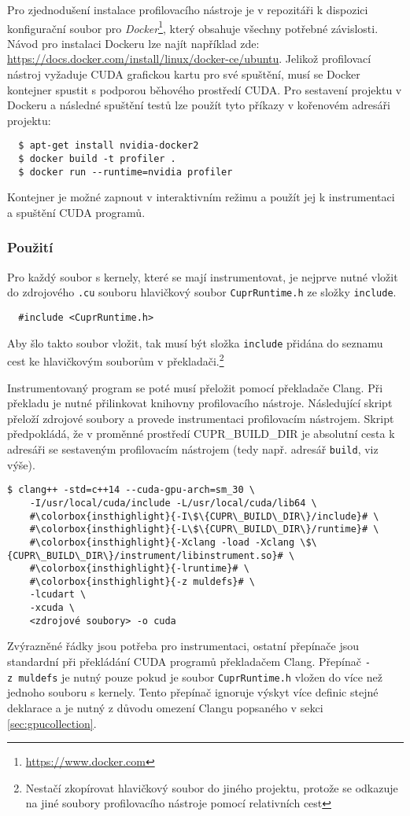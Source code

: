 Pro zjednodušení instalace profilovacího nástroje je v repozitáři k dispozici konfigurační soubor pro \emph{Docker}\footnote{\url{https://www.docker.com}}, který obsahuje všechny potřebné závislosti. Návod pro instalaci Dockeru lze najít například zde: \url{https://docs.docker.com/install/linux/docker-ce/ubuntu}.
Jelikož profilovací nástroj vyžaduje CUDA grafickou kartu pro své spuštění, musí se Docker kontejner spustit s podporou běhového prostředí CUDA. Pro sestavení projektu v Dockeru a následné spuštění testů lze použít tyto příkazy v kořenovém adresáři projektu:
\begin{verbatim}
  $ apt-get install nvidia-docker2
  $ docker build -t profiler .
  $ docker run --runtime=nvidia profiler
\end{verbatim}

Kontejner je možné zapnout v interaktivním režimu a použít jej k instrumentaci a spuštění CUDA programů.

\subsubsection{Použití}
\label{manual:usage}
Pro každý soubor s kernely, které se mají instrumentovat, je nejprve nutné vložit do zdrojového \texttt{.cu} souboru hlavičkový soubor \texttt{CuprRuntime.h} ze složky \texttt{include}.
\begin{verbatim}
  #include <CuprRuntime.h>
\end{verbatim}
Aby šlo takto soubor vložit, tak musí být složka \texttt{include} přidána do seznamu cest ke hlavičkovým souborům v překladači.\footnote{Nestačí zkopírovat hlavičkový soubor do jiného projektu, protože se odkazuje na jiné soubory profilovacího nástroje pomocí relativních cest}

Instrumentovaný program se poté musí přeložit pomocí překladače Clang. Při překladu je nutné přilinkovat knihovny profilovacího nástroje. Následující skript přeloží zdrojové soubory a provede instrumentaci profilovacím nástrojem. Skript předpokládá, že v proměnné prostředí CUPR\_BUILD\_DIR je absolutní cesta k adresáři se sestaveným profilovacím nástrojem (tedy např. adresář \texttt{build}, viz výše).

\begin{verbatim}
$ clang++ -std=c++14 --cuda-gpu-arch=sm_30 \
    -I/usr/local/cuda/include -L/usr/local/cuda/lib64 \
    #\colorbox{insthighlight}{-I\$\{CUPR\_BUILD\_DIR\}/include}# \
    #\colorbox{insthighlight}{-L\$\{CUPR\_BUILD\_DIR\}/runtime}# \
    #\colorbox{insthighlight}{-Xclang -load -Xclang \$\{CUPR\_BUILD\_DIR\}/instrument/libinstrument.so}# \
    #\colorbox{insthighlight}{-lruntime}# \
    #\colorbox{insthighlight}{-z muldefs}# \
    -lcudart \
    -xcuda \
    <zdrojové soubory> -o cuda
\end{verbatim}
Zvýrazněné řádky jsou potřeba pro instrumentaci, ostatní přepínače jsou standardní při překládání CUDA programů překladačem Clang. Přepínač \texttt{-z\ muldefs} je nutný pouze pokud je soubor \texttt{CuprRuntime.h} vložen do více než jednoho souboru s kernely. Tento přepínač ignoruje výskyt více definic stejné deklarace a je nutný z důvodu omezení Clangu popsaného v sekci \ref{sec:gpucollection}.


